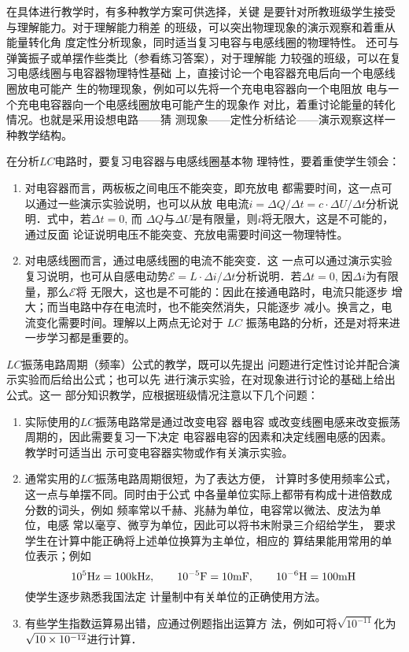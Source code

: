 在具体进行教学时，有多种教学方案可供选择，关键
是要针对所教班级学生接受与理解能力。对于理解能力稍差
的班级，可以突出物理现象的演示观察和着重从能量转化角
度定性分析现象，同时适当复习电容与电感线圈的物理特性。
还可与弹簧振子或单摆作些类比（参看练习答案），对于理解能
力较强的班级，可以在复习电感线圈与电容器物理特性基础
上，直接讨论一个电容器充电后向一个电感线圈放电可能产
生的物理现象，例如可以先将一个充电电容器向一个电阻放
电与一个充电电容器向一个电感线圈放电可能产生的现象作
对比，着重讨论能量的转化情况。也就是采用设想电路——猜
测现象——定性分析结论——演示观察这样一种教学结构。

在分析$LC$电路时，要复习电容器与电感线圈基本物
理特性，要着重使学生领会：
\begin{enumerate}
    \item 对电容器而言，两板板之间电压不能突变，即充放电
都需要时间，这一点可以通过一些演示实验说明，也可以从放
电电流$i=\Delta Q/\Delta t=c\cdot \Delta U/\Delta t$分析说明．式中，若$\Delta t=0$, 而
$\Delta Q$与$\Delta U$是有限量，则$i$将无限大，这是不可能的，通过反面
论证说明电压不能突变、充放电需要时间这一物理特性。
\item 对电感线圈而言，通过电感线圈的电流不能突变．这
一点可以通过演示实验复习说明，也可从自感电动势$\mathcal{E}=
L\cdot \Delta i/\Delta t$分析说明．若$\Delta t=0$, 因$\Delta i$为有限量，那么$\mathcal{E}$将
无限大，这也是不可能的：因此在接通电路时，电流只能逐步
增大；而当电路中存在电流时，也不能突然消失，只能逐步
减小。换言之，电流变化需要时间。理解以上两点无论对于
$LC$ 振荡电路的分析，还是对将来进一步学习都是重要的。
\end{enumerate}

$LC$振荡电路周期（频率）公式的教学，既可以先提出
问题进行定性讨论并配合演示实验而后给出公式；也可以先
进行演示实验，在对现象进行讨论的基础上给出公式。这一
部分知识教学，应根据班级情况注意以下几个问题：
\begin{enumerate}
\item 实际使用的$LC$振荡电路常是通过改变电容 器电容
或改变线圈电感来改变振荡周期的，因此需要复习一下决定
电容器电容的因素和决定线圈电感的因素。教学时可适当出
示可变电容器实物或作有关演示实验。
\item 通常实用的$LC$振荡电路周期很短，为了表达方便，
计算时多使用频率公式，这一点与单摆不同。同时由于公式
中各量单位实际上都带有构成十进倍数成分数的词头，例如
频率常以千赫、兆赫为单位，电容常以微法、皮法为单位，电感
常以毫亨、微亨为单位，因此可以将书末附录三介绍给学生，
要求学生在计算中能正确将上述单位换算为主单位，相应的
算结果能用常用的单位表示；例如
\[10^5{\rm Hz}=100{\rm kHz},\qquad 10^{-5}{\rm F}
=10{\rm mF},\qquad 10^{-6}{\rm H}=100{\rm mH}\]
使学生逐步熟悉我国法定
计量制中有关单位的正确使用方法。
\item 有些学生指数运算易出错，应通过例题指出运算方
法，例如可将$\sqrt{10^{-11}}$化为$\sqrt{10\times10^{-12}}$进行计算．
\end{enumerate}

